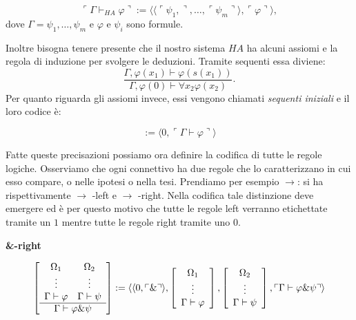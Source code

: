 \begin{displaymath}
\ulcorner \Gamma\vdash_{HA} \varphi \urcorner :=  \langle \langle \ulcorner \psi_1, \urcorner,  \ldots ,  \ulcorner \psi_m \urcorner \rangle ,  \ulcorner \varphi \urcorner \rangle ,
\end{displaymath}
dove $\Gamma = \psi_1,\ldots,\psi_m$ e $\varphi$ e $\psi_i$ sono formule.

Inoltre bisogna tenere presente che il nostro sistema $HA$ ha alcuni assiomi e la regola di induzione per svolgere le deduzioni. Tramite sequenti essa diviene:
\begin{displaymath}
\frac{\Gamma, \varphi(x_1) \vdash \varphi(s(x_1))}{\Gamma, \varphi(0)\vdash \forall x_2 \varphi(x_2)}.
\end{displaymath}
Per quanto riguarda gli assiomi invece, essi vengono chiamati \emph{sequenti iniziali} e il loro codice \`e:

\begin{displaymath}
[ \Gamma\vdash \varphi ] :=  \langle 0,  \ulcorner \Gamma\vdash \varphi \urcorner  \rangle
\end{displaymath}

Fatte queste precisazioni possiamo ora definire la codifica di tutte le regole logiche. Osserviamo che ogni connettivo ha due regole che lo caratterizzano in cui esso compare, o nelle ipotesi o nella tesi. Prendiamo per esempio $\rightarrow$: si ha rispettivamente $\rightarrow$ -left e $\rightarrow$ -right. Nella codifica tale distinzione deve emergere ed \`e per questo motivo che tutte le regole left verranno etichettate tramite un $1$ mentre tutte le regole right tramite uno $0$.

\vspace{0.5cm}
\textbf{\&-right}

$$
\left [
\begin{array}{cc}
\Omega_1 & \Omega_{2} \\
\vdots & \vdots\\
\Gamma \vdash \varphi & \Gamma \vdash \psi\\
\hline
\multicolumn{2}{c}{\Gamma \vdash \varphi \& \psi}\\
\end{array}
\right ]
:= \langle \langle 0,\ulcorner \& \urcorner \rangle ,
\left [
\begin{array}{c}
\Omega_1\\
\vdots\\
\Gamma \vdash \varphi\\
\end{array}
\right ],
\left [
\begin{array}{c}
\Omega_2\\
\vdots\\
\Gamma \vdash \psi\\
\end{array}
\right],
\ulcorner \Gamma \vdash \varphi \& \psi \urcorner \rangle
$$

